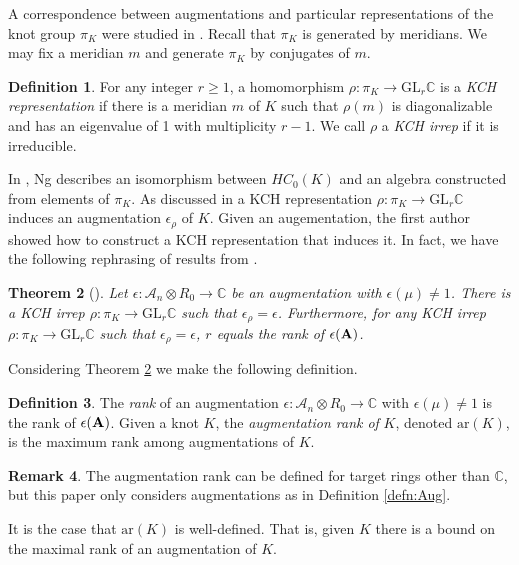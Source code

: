 \documentclass[11pt]{amsart}
\def\C{{\mathbb C}}
\def\A{{\mathcal A}}
\newtheorem{thm}{Theorem}[section]
\theoremstyle{definition}
\newtheorem{defn}[thm]{Definition}
\newtheorem{rem}[thm]{Remark}
\begin{document}
  A correspondence between augmentations and particular representations of the knot group $\pi_K$ were studied in \cite{Cor13a}. Recall that $\pi_K$ is generated by meridians. We may fix a meridian $m$ and generate $\pi_K$ by conjugates of $m$.

  \begin{defn}
  For any integer $r\ge1$, a homomorphism $\rho:\pi_K\to\text{GL}_r\C$ is a \emph{KCH representation} if there is a meridian $m$ of $K$ such that $\rho(m)$ is diagonalizable and has an eigenvalue of 1 with multiplicity $r-1$. We call $\rho$ a \emph{KCH irrep} if it is irreducible.
  \label{defn:KCHReps}
  \end{defn}

  In \cite{Ng08}, Ng describes an isomorphism between $HC_0(K)$ and an algebra constructed from elements of $\pi_K$. As discussed in \cite{Ng12} a KCH representation $\rho:\pi_K\to\text{GL}_r\C$ induces an augmentation $\epsilon_\rho$ of $K$. Given an augementation, the first author showed how to construct a KCH representation that induces it. In fact, we have the following rephrasing of results from \cite{Cor13a}.

  \begin{thm}[\cite{Cor13a}]
  Let $\epsilon:\A_n\otimes R_0\to\C$ be an augmentation with $\epsilon(\mu)\ne 1$. There is a KCH irrep $\rho:\pi_K\to\text{GL}_r\C$ such that $\epsilon_\rho=\epsilon$. Furthermore, for any KCH irrep $\rho:\pi_K\to\text{GL}_r\C$ such that $\epsilon_\rho = \epsilon$, $r$ equals the rank of $\epsilon({\bf A})$.
  \label{thm:AugKCH_Corresp}
  \end{thm}

  Considering Theorem \ref{thm:AugKCH_Corresp} we make the following definition.

  \begin{defn}
  The \emph{rank} of an augmentation $\epsilon:\A_n\otimes R_0\to\C$ with $\epsilon(\mu)\ne 1$ is the rank of $\epsilon({\bf A})$. Given a knot $K$, the \emph{augmentation rank of} $K$, denoted $\text{ar}(K)$, is the maximum rank among augmentations of $K$.
  \label{defn:AugRk}
  \end{defn}

  \begin{rem} The augmentation rank can be defined for target rings other than $\C$, but this paper only considers augmentations as in Definition \ref{defn:Aug}.
  \end{rem}

  It is the case that $\text{ar}(K)$ is well-defined. That is, given $K$ there is a bound on the maximal rank of an augmentation of $K$.
\end{document}
